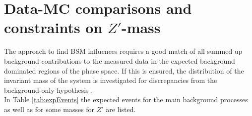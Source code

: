 
\section{Data-MC comparisons and constraints on $Z'$-mass}
The approach to find BSM influences requires a good match of all summed up background contributions to the measured data in the expected background
dominated regions of the phase space. If this is ensured, the distribution of the invariant mass of the system is investigated for discrepancies 
from the background-only hypothesis \cite{anl}. \\
\noindent In Table \ref{tab:expEvents} the expected events for the main background processes as well as for some masses for $Z'$ are listed. 

